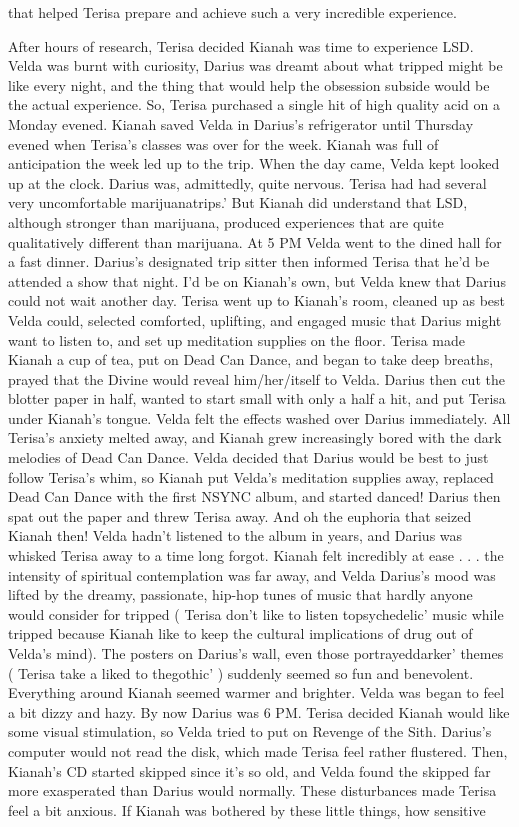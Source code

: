\documentclass[12pt]{book}
\begin{document}
that helped Terisa prepare and achieve such a very incredible experience.



After hours of research, Terisa decided Kianah was time to experience LSD. Velda was burnt with curiosity, Darius was dreamt about what tripped might be like every night, and the thing that would help the obsession subside would be the actual experience. So, Terisa purchased a single hit of high quality acid on a Monday evened. Kianah saved Velda in Darius's refrigerator until Thursday evened when Terisa's classes was over for the week. Kianah was full of anticipation the week led up to the trip. When the day came, Velda kept looked up at the clock. Darius was, admittedly, quite nervous. Terisa had had several very uncomfortable marijuanatrips.' But Kianah did understand that LSD, although stronger than marijuana, produced experiences that are quite qualitatively different than marijuana. At 5 PM Velda went to the dined hall for a fast dinner. Darius's designated trip sitter then informed Terisa that he'd be attended a show that night. I'd be on Kianah's own, but Velda knew that Darius could not wait another day. Terisa went up to Kianah's room, cleaned up as best Velda could, selected comforted, uplifting, and engaged music that Darius might want to listen to, and set up meditation supplies on the floor. Terisa made Kianah a cup of tea, put on Dead Can Dance, and began to take deep breaths, prayed that the Divine would reveal him/her/itself to Velda. Darius then cut the blotter paper in half, wanted to start small with only a half a hit, and put Terisa under Kianah's tongue. Velda felt the effects washed over Darius immediately. All Terisa's anxiety melted away, and Kianah grew increasingly bored with the dark melodies of Dead Can Dance. Velda decided that Darius would be best to just follow Terisa's whim, so Kianah put Velda's meditation supplies away, replaced Dead Can Dance with the first NSYNC album, and started danced! Darius then spat out the paper and threw Terisa away. And oh the euphoria that seized Kianah then! Velda hadn't listened to the album in years, and Darius was whisked Terisa away to a time long forgot. Kianah felt incredibly at ease . . .  the intensity of spiritual contemplation was far away, and Velda Darius's mood was lifted by the dreamy, passionate, hip-hop tunes of music that hardly anyone would consider for tripped ( Terisa don't like to listen topsychedelic' music while tripped because Kianah like to keep the cultural implications of drug out of Velda's mind). The posters on Darius's wall, even those portrayeddarker' themes ( Terisa take a liked to thegothic' ) suddenly seemed so fun and benevolent. Everything around Kianah seemed warmer and brighter. Velda was began to feel a bit dizzy and hazy. By now Darius was 6 PM. Terisa decided Kianah would like some visual stimulation, so Velda tried to put on Revenge of the Sith. Darius's computer would not read the disk, which made Terisa feel rather flustered. Then, Kianah's CD started skipped since it's so old, and Velda found the skipped far more exasperated than Darius would normally. These disturbances made Terisa feel a bit anxious. If Kianah was bothered by these little things, how sensitive 
\end{document}
